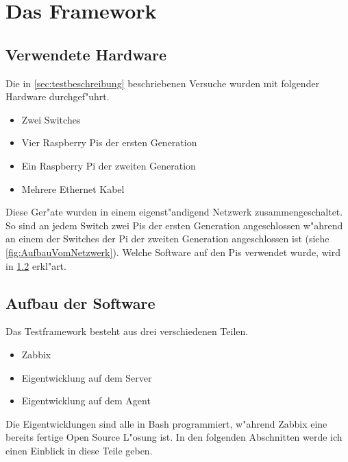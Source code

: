 \chapter{Das Framework}
\label{cha:framework}
\section{Verwendete Hardware} \label{sec:verwendeteHardware}
Die in \cref{sec:testbeschreibung} beschriebenen Versuche wurden mit folgender Hardware durchgef"uhrt. %
\begin{itemize}
\item Zwei Switches
\item Vier Raspberry Pis der ersten Generation
\item Ein Raspberry Pi der zweiten Generation
\item Mehrere Ethernet Kabel
\end{itemize}
Diese Ger"ate wurden in einem eigenst"andigend Netzwerk zusammengeschaltet. So sind an jedem Switch zwei Pis %
der ersten Generation angeschlossen w"ahrend an einem der Switches der Pi der zweiten Generation angeschlossen %
ist (siehe \cref{fig:AufbauVomNetzwerk}). Welche Software auf den Pis verwendet wurde, wird in \cref{sec:aufbauSoftware} erkl"art. 

\section{Aufbau der Software} \label{sec:aufbauSoftware}
Das Testframework besteht aus drei verschiedenen Teilen. %
\begin{itemize}
\item Zabbix %
\item Eigentwicklung auf dem Server %
\item Eigentwicklung auf dem Agent %
\end{itemize}
Die Eigentwicklungen sind alle in Bash programmiert, w"ahrend Zabbix eine bereits fertige Open Source L"osung %
ist. In den folgenden Abschnitten werde ich einen Einblick in diese Teile geben. %

